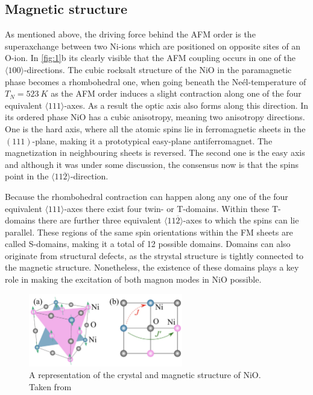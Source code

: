 \subsection{Magnetic structure}
As mentioned above, the driving force behind the AFM order is the superaxchange between two Ni-ions which are positioned on opposite sites of an O-ion.
In \autoref{fig:1}b its clearly visible that the AFM coupling occurs in one of the $\langle100\rangle$-directions.
The cubic rocksalt structure of the NiO in the paramagnetic phase becomes a rhombohedral one, when going beneath the Neél-temperature of $T_N = \qty{523}{K}$ as the AFM order induces a slight contraction along one of the four equivalent $\langle111\rangle$-axes.
As a result the optic axis also forms along this direction.
In its ordered phase NiO has a cubic anisotropy, meaning two anisotropy directions.
One is the hard axis, where all the atomic spins lie in ferromagnetic sheets in the $(111)$-plane, making it a prototypical easy-plane antiferromagnet.
The magnetization in neighbouring sheets is reversed.
The second one is the easy axis and although it was under some discussion, the consensus now is  that the spins point in the $\langle11\overline{2}\rangle$-direction.

Because the rhombohedral contraction can happen along any one of the four equivalent $\langle111\rangle$-axes there exist four twin- or T-domains.
Within these T-domains there are further three equivalent $\langle11\overline{2}\rangle$-axes to which the spins can lie parallel.
These regions of the same spin orientations within the FM sheets are called S-domains, making it a total of 12 possible domains.
Domains can also originate from structural defects, as the strystal structure is tightly connected to the magnetic structure.
Nonetheless, the existence of these domains plays a key role in making the excitation of both magnon modes in NiO possible.
\begin{figure}[ht]
    \centering
    \includegraphics[width=0.6\textwidth]{pictures/1.png}
    \caption{A representation of the crystal and magnetic structure of NiO. Taken from }
    \label{fig:1}
\end{figure}
\FloatBarrier

